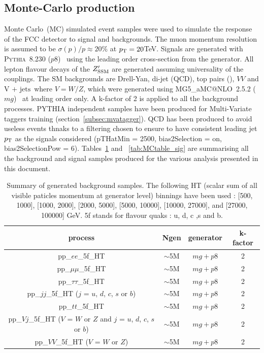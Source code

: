 \documentclass{cernrep}
\newcommand*{\vj}{\ensuremath{\text{V + jets}}}
\begin{document}
\subsection{Monte-Carlo production}
\label{subsec:mcprod}

Monte Carlo~(MC) simulated event samples were used to simulate the response of the FCC detector to signal and backgrounds. The muon momentum resolution is assumed to be $\sigma(p)/p \approx 20\%$ at $p_{\text{T}}= 20 $TeV. Signals are generated with {\scshape Pythia}~8.230 ($p8$)~\cite{Sjostrand:2014zea} using the leading order cross-section from the generator.
All lepton flavour decays of the $Z^{\prime}_{\mathrm{SSM}}$ are generated assuming universality of the couplings.
The SM backgrounds are Drell-Yan, di-jet (QCD), top pairs (\ttbar), $VV$ and \vj\ where $V=W/Z$, which were generated using {\scshape MG5\_}a{\scshape MC@NLO}~2.5.2 ($mg$)~\cite{Alwall:2014} at leading order only. A k-factor of 2 is applied to all the background processes. \newline
PYTHIA independent samples have been produced for Multi-Variate taggers training (section~\ref{subsec:mvatagger}). QCD has been produced to avoid useless events thnaks to a filtering chosen to ensure to have consistent leading jet $p\sb{\scriptstyle\mathrm{T}}$ as the signals considered (pTHatMin = 2500, bias2Selection = on, bias2SelectionPow = 6).\newline
Tables~\ref{tab:MCtable_bkgd} and ~\ref{tab:MCtable_sig} are summarising all the background and signal samples produced for the various analysis presented in this document.

\begin{table}[!htb]\centering
\begin{tabular}{|c|c|c|c|}
\hline
\hline		
process & Ngen & generator & k-factor \\
\hline		
pp\_$ee$\_5f\_HT & $\sim$5M & $mg+p8$ & 2 \\
pp\_$\mu\mu$\_5f\_HT & $\sim$5M & $mg+p8$ & 2 \\
pp\_$\tau\tau$\_5f\_HT & $\sim$5M & $mg+p8$ & 2 \\
pp\_$jj$\_5f\_HT ($j$ = $u$, $d$, $c$, $s$ or $b$) & $\sim$5M & $mg+p8$ & 2 \\
pp\_$tt$\_5f\_HT & $\sim$5M & $mg+p8$ & 2 \\
pp\_$Vj$\_5f\_HT ($V$ = $W$ or $Z$ and $j$ = $u$, $d$, $c$, $s$ or $b$) & $\sim$5M & $mg+p8$ & 2 \\
pp\_$VV$\_5f\_HT ($V$ = $W$ or $Z$) & $\sim$5M & $mg+p8$ & 2 \\
\hline
\hline
\end{tabular}
\caption{Summary of generated background samples. The following HT (scalar sum of all visible paticles momentum at generator level) binnings have been used : [500, 1000], [1000, 2000], [2000, 5000], [5000, 10000], [10000, 27000], and [27000, 100000] GeV. 5f stands for flavour quaks : u, d, c ,s  and b.}
\label{tab:MCtable_bkgd}
\end{table}
\end{document}
